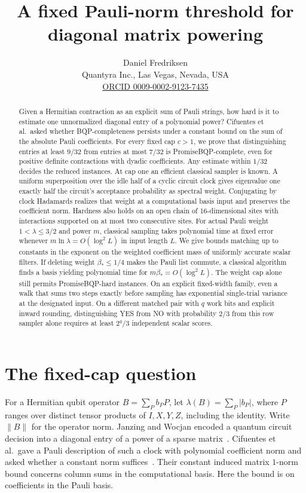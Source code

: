 \documentclass[11pt]{article}
\title{A fixed Pauli-norm threshold for diagonal matrix powering}
\author{Daniel Fredriksen\\[2pt]\small Quantyra Inc., Las Vegas, Nevada, USA\\
\small \href{https://orcid.org/0009-0002-9123-7435}{ORCID 0009-0002-9123-7435}}
\date{}
\newcommand{\norm}[1]{\lVert #1\rVert}
\begin{document}
\maketitle
\begin{abstract}
Given a Hermitian contraction as an explicit sum of Pauli strings, how hard is it to estimate one unnormalized diagonal entry of a polynomial power? Cifuentes et al.\ asked whether BQP-completeness persists under a constant bound on the sum of the absolute Pauli coefficients. For every fixed cap \(c>1\), we prove that distinguishing entries at least \(9/32\) from entries at most \(7/32\) is PromiseBQP-complete, even for positive definite contractions with dyadic coefficients. Any estimate within \(1/32\) decides the reduced instances. At cap one an efficient classical sampler is known. A uniform superposition over the idle half of a cyclic circuit clock gives eigenvalue one exactly half the circuit's acceptance probability as spectral weight. Conjugating by clock Hadamards realizes that weight at a computational basis input and preserves the coefficient norm.
Hardness also holds on an open chain of 16-dimensional sites with interactions supported on at most two consecutive sites. For actual Pauli weight \(1<\lambda\le3/2\) and power \(m\), classical sampling takes polynomial time at fixed error whenever \(m\ln\lambda=O(\log^2 L)\) in input length \(L\). We give bounds matching up to constants in the exponent on the weighted coefficient mass of uniformly accurate scalar filters.
If deleting weight \(\beta_*\le1/4\) makes the Pauli list commute, a classical algorithm finds a basis yielding polynomial time for \(m\beta_*=O(\log^2 L)\). The weight cap alone still permits PromiseBQP-hard instances.
On an explicit fixed-width family, even a walk that sums two steps exactly before sampling has exponential single-trial variance at the designated input. On a different matched pair with \(q\) work bits and explicit inward rounding, distinguishing YES from NO with probability \(2/3\) from this row sampler alone requires at least \(2^q/3\) independent scalar scores.
\end{abstract}

\section{The fixed-cap question}
For a Hermitian qubit operator \(B=\sum_P b_PP\), let \(\lambda(B)=\sum_P|b_P|\), where \(P\) ranges over distinct tensor products of \(I,X,Y,Z\), including the identity. Write \(\norm{B}\) for the operator norm. Janzing and Wocjan encoded a quantum circuit decision into a diagonal entry of a power of a sparse matrix~\cite{jw}. Cifuentes et al.\ gave a Pauli description of such a clock with polynomial coefficient norm and asked whether a constant norm suffices~\cite[Discussion and Sec.~IV\,A]{cif}. Their constant induced matrix \(1\)-norm bound concerns column sums in the computational basis. Here the bound is on coefficients in the Pauli basis.
\end{document}
